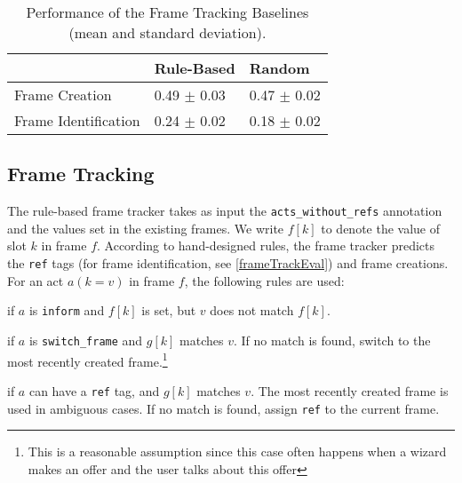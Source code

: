\documentclass{article}
\theoremstyle{definition}
\begin{document}
\begin{table*}[!t]
\begin{center}
\caption{Performance of the Frame Tracking Baselines (mean and standard deviation).}
\begin{tabu}to
\toprule
                   & {Rule-Based} & {Random}\\\midrule
Frame Creation  &   0.49 $\pm$ 0.03     &   0.47 $\pm$ 0.02 \\
Frame Identification & 0.24 $\pm$ 0.02  &  0.18 $\pm$ 0.02 \\
\bottomrule
\end{tabu}
\label{tab:baseline_results}
\end{center}
\end{table*}

\subsection{Frame Tracking}
The rule-based frame tracker takes as input the \texttt{acts\_without\_refs} annotation and the values set in the existing frames. We write $f[k]$ to denote the value of slot $k$ in frame $f$. According to hand-designed rules, the frame tracker predicts the \texttt{ref} tags (for frame identification, see \cref{frameTrackEval}) and frame creations. For an act $a(k{=}v)$ in frame $f$, the following rules are used:
\begin{description}[noitemsep,font=$\bullet$ \itshape\mdseries,leftmargin=3mm]
	\item [Create and switch to a new frame] if $a$ is \texttt{inform} and $f[k]$ is set, but $v$ does not match $f[k]$.
  \item [Switch to frame $g$] if $a$ is \texttt{switch\_frame} and $g[k]$ matches $v$. If no match is found, switch to the most recently created frame.\footnote{This is a reasonable assumption since this case often happens when a wizard makes an offer and the user talks about this offer}
  \item [Assign \texttt{ref} to frame $g$] if $a$ can have a \texttt{ref} tag, and $g[k]$ matches $v$. The most recently created frame is used in ambiguous cases. If no match is found, assign \texttt{ref} to the current frame.
\end{description}
\end{document}
